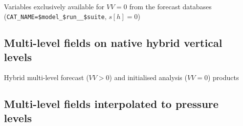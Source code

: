 \renewcommand{\onlyglb}[1]{#1}
\renewcommand{\onlyloc}[1]{}
%
\begin{vartable}{\caption{Variables exclusively available for $VV=0$ from the forecast databases (\texttt{CAT\_NAME=\$model\_\$run\_\_\$suite}, $s[h]=0$)}\label{table_init_output}}
  
  

\end{vartable}



\subsection{Multi-level fields on native hybrid vertical levels}

\renewcommand{\onlyglb}[1]{#1}
\renewcommand{\onlyloc}[1]{}
%
\begin{vartable}{\caption{Hybrid multi-level forecast ($VV>0$) and initialised analysis ($VV=0$) products}}
  
  

\end{vartable}



\subsection{Multi-level fields interpolated to pressure levels}

\renewcommand{\pressurelevelsTriangular}{$1000$, $950$, $850$, $700$, $500$, $300$ $\mathrm{hPa}$}

\renewcommand{\new}[1]{\textcolor{red}{#1}}
\renewcommand{\pressurelevelsRegular}{$1000$, \new{$975$}, $950$, $925$, $900$, 
                                    $875$, $850$, \new{$825$}, $800$, 
                                    \new{$775$}, $750$, \new{$725$}, $700$, $600$, 
                                    $500$, $400$, $300$, $250$, $200$, $150$, $100$, 
                                    $70$, $50$, $30$, \new{$20$}, $10$, 
                                    \new{$7$}, $5$, \new{$3$}, 
                                    \new{$2$}, \new{$1$}, 
                                     \new{$0.3$}, \new{$0.1$} $\mathrm{hPa}$}

